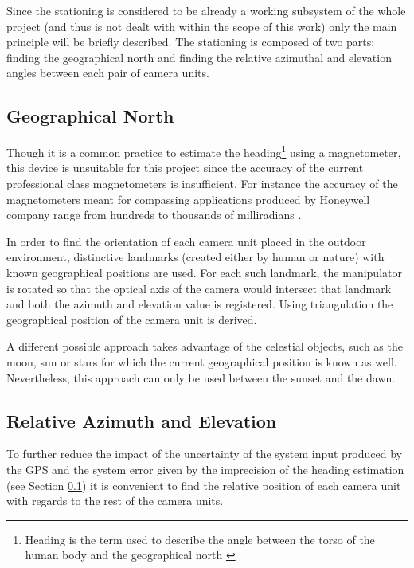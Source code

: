 Since the stationing is considered to be already a working subsystem of the whole project (and thus is not dealt with within the scope of this work) only the main principle will be briefly described. The stationing is composed of two parts: finding the geographical north and finding the relative azimuthal and elevation angles between each pair of camera units.

\subsection{Geographical North} \label{txt:geographical_north}

Though it is a common practice to estimate the heading\footnote{Heading is the term used to describe the angle between the torso of the human body and the geographical north \cite{Henriksson648760}} using a magnetometer, this device is unsuitable for this project since the accuracy of the current professional class magnetometers is insufficient. For instance the accuracy of the magnetometers meant for compassing applications produced by Honeywell company range from hundreds to thousands of milliradians \cite{Honeywell:compassing_catalog}.

In order to find the orientation of each camera unit placed in the outdoor environment, distinctive landmarks (created either by human or nature) with known geographical positions are used. For each such landmark, the manipulator is rotated so that the optical axis of the camera would intersect that landmark and both the azimuth and elevation value is registered. Using triangulation the geographical position of the camera unit is derived. 

A different possible approach takes advantage of the celestial objects, such as the moon, sun or stars for which the current geographical position is known as well. Nevertheless, this approach can only be used between the sunset and the dawn.

\subsection{Relative Azimuth and Elevation}

To further reduce the impact of the uncertainty of the system input produced by the GPS and the system error given by the imprecision of the heading estimation (see Section \ref{txt:geographical_north}) it is convenient to find the relative position of each camera unit with regards to the rest of the camera units.

